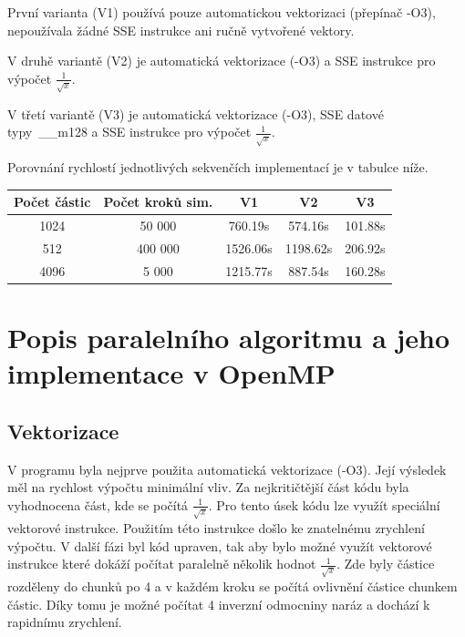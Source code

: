 \documentclass[12pt]{article}
\begin{document}
První varianta (V1) používá pouze automatickou vektorizaci (přepínač -O3), nepoužívala žádné SSE instrukce ani ručně vytvořené vektory.

V druhě variantě (V2) je automatická vektorizace (-O3) a SSE instrukce pro výpočet ${\frac{1}{\sqrt{x}}}$.

V třetí variantě (V3) je automatická vektorizace (-O3), SSE datové typy~\_\_m128 a SSE in\-struk\-ce pro výpočet ${\frac{1}{\sqrt{x}}}$.

Porovnání rychlostí jednotlivých sekvenčích implementací je v tabulce níže.

\begin{center}
\begin{tabular}{c | c | c | c | c}
\textbf{Počet částic} & \textbf{Počet kroků sim.}  & \textbf{V1} & \textbf{V2} & \textbf{V3} \\ \hline \hline
1024 & 50 000 & 760.19s & 574.16s & 101.88s \\ \hline
512 & 400 000 & 1526.06s & 1198.62s & 206.92s \\ \hline
4096 & 5 000 & 1215.77s & 887.54s & 160.28s \\ \hline
\end{tabular}
\end{center}

\section{Popis paralelního algoritmu a jeho implementace v OpenMP}


\subsection{Vektorizace}

V prog\-ramu byla nej\-prve pou\-žita au\-toma\-tická vekto\-ri\-za\-ce (-O3).
Její výsledek měl na rychlost výpočtu minimální vliv. Za nejkritičtější část kódu byla vyhodnocena část, kde se počítá ${\frac{1}{\sqrt{x}}}$.
Pro tento úsek kódu lze využít speciální vektorové instrukce. Použitím této instrukce došlo ke znatelnému zrychlení výpočtu.
V další fázi byl kód upraven, tak aby bylo možné využít vektorové instrukce které dokáží počítat paralelně několik hodnot ${\frac{1}{\sqrt{x}}}$.
Zde byly částice rozděleny do chunků po 4 a v každém kroku se počítá ovlivnění částice chunkem částic.
Díky tomu je možné počítat 4 inverzní odmocniny naráz a dochází k rapidnímu zrychlení. 
\end{document}
